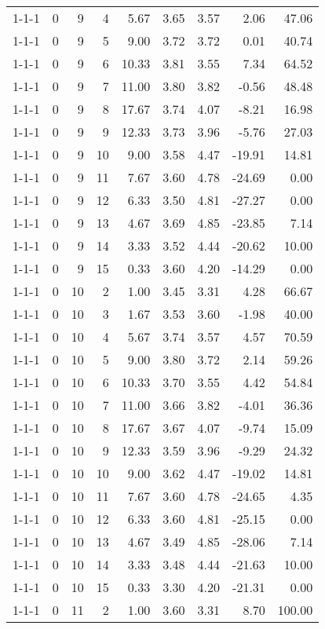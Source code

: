 \begin{tabular}{lrrrrrrrr}
1-1-1 & 0 & 9 & 4 & 5.67 & 3.65 & 3.57 & 2.06 & 47.06 \\
1-1-1 & 0 & 9 & 5 & 9.00 & 3.72 & 3.72 & 0.01 & 40.74 \\
1-1-1 & 0 & 9 & 6 & 10.33 & 3.81 & 3.55 & 7.34 & 64.52 \\
1-1-1 & 0 & 9 & 7 & 11.00 & 3.80 & 3.82 & -0.56 & 48.48 \\
1-1-1 & 0 & 9 & 8 & 17.67 & 3.74 & 4.07 & -8.21 & 16.98 \\
1-1-1 & 0 & 9 & 9 & 12.33 & 3.73 & 3.96 & -5.76 & 27.03 \\
1-1-1 & 0 & 9 & 10 & 9.00 & 3.58 & 4.47 & -19.91 & 14.81 \\
1-1-1 & 0 & 9 & 11 & 7.67 & 3.60 & 4.78 & -24.69 & 0.00 \\
1-1-1 & 0 & 9 & 12 & 6.33 & 3.50 & 4.81 & -27.27 & 0.00 \\
1-1-1 & 0 & 9 & 13 & 4.67 & 3.69 & 4.85 & -23.85 & 7.14 \\
1-1-1 & 0 & 9 & 14 & 3.33 & 3.52 & 4.44 & -20.62 & 10.00 \\
1-1-1 & 0 & 9 & 15 & 0.33 & 3.60 & 4.20 & -14.29 & 0.00 \\
1-1-1 & 0 & 10 & 2 & 1.00 & 3.45 & 3.31 & 4.28 & 66.67 \\
1-1-1 & 0 & 10 & 3 & 1.67 & 3.53 & 3.60 & -1.98 & 40.00 \\
1-1-1 & 0 & 10 & 4 & 5.67 & 3.74 & 3.57 & 4.57 & 70.59 \\
1-1-1 & 0 & 10 & 5 & 9.00 & 3.80 & 3.72 & 2.14 & 59.26 \\
1-1-1 & 0 & 10 & 6 & 10.33 & 3.70 & 3.55 & 4.42 & 54.84 \\
1-1-1 & 0 & 10 & 7 & 11.00 & 3.66 & 3.82 & -4.01 & 36.36 \\
1-1-1 & 0 & 10 & 8 & 17.67 & 3.67 & 4.07 & -9.74 & 15.09 \\
1-1-1 & 0 & 10 & 9 & 12.33 & 3.59 & 3.96 & -9.29 & 24.32 \\
1-1-1 & 0 & 10 & 10 & 9.00 & 3.62 & 4.47 & -19.02 & 14.81 \\
1-1-1 & 0 & 10 & 11 & 7.67 & 3.60 & 4.78 & -24.65 & 4.35 \\
1-1-1 & 0 & 10 & 12 & 6.33 & 3.60 & 4.81 & -25.15 & 0.00 \\
1-1-1 & 0 & 10 & 13 & 4.67 & 3.49 & 4.85 & -28.06 & 7.14 \\
1-1-1 & 0 & 10 & 14 & 3.33 & 3.48 & 4.44 & -21.63 & 10.00 \\
1-1-1 & 0 & 10 & 15 & 0.33 & 3.30 & 4.20 & -21.31 & 0.00 \\
1-1-1 & 0 & 11 & 2 & 1.00 & 3.60 & 3.31 & 8.70 & 100.00 \\

\end{tabular}
